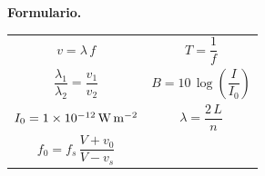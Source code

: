 \documentclass[12pt, letter]{exam}
\begin{document}
\begin{questions}
\end{questions}

\newpage

\textbf{\huge{Formulario.}}
\begin{table}[H]
    \centering
    \setlength{\tabcolsep}{40pt}
    \renewcommand{\arraystretch}{2.5}
    \begin{tabular}{c  c}
            $v = \lambda \, f$ & $T = \dfrac{1}{f}$ \\
		    $\dfrac{\lambda_{1}}{\lambda_{2}} = \dfrac{v_{1}}{v_{2}}$ & $B = 10 \, \log \left( \dfrac{I}{I_{0}} \right)$ \\
            $I_{0} = \SI{1d-12}{\watt\per\square\meter}$ & $\lambda = \dfrac{2 \, L}{n}$ \\
            $f_{0} = f_{s} \, \dfrac{V + v_{0}}{V - v_{s}}$ &  \\
\end{tabular}
\end{table}
\end{document}
